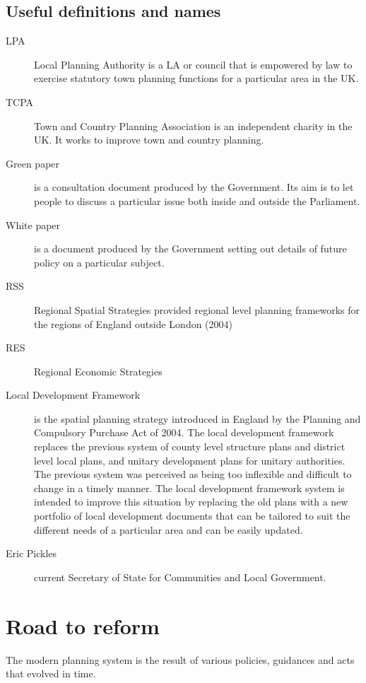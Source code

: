 \documentclass{article}
\begin{document}
	\subsection*{Useful definitions and names}
	\begin{description}
		\item[LPA] Local Planning Authority is a LA or council that is empowered by law to exercise statutory
		town planning functions for a particular area in the UK.
		\item[TCPA] Town and Country Planning Association is an independent charity in the UK. It works
		to improve town and country planning.
		\item[Green paper] is a consultation document produced by the Government. Its aim is to let people
		to discuss a particular issue both inside and outside the Parliament. 
		\item[White paper] is a document produced by the Government setting out details
		of future policy on a particular subject.
		\item[RSS] Regional Spatial Strategies
		provided regional level planning frameworks for the regions of England outside London (2004)
		\item[RES] Regional Economic Strategies
		\item[Local Development Framework] is the spatial planning strategy introduced in England by the
		Planning and Compulsory Purchase Act of 2004.
		The local development framework replaces the previous system of county level structure plans and
		district level local plans, and unitary development plans for unitary authorities.
		The previous system was perceived as being too inflexible and difficult to change in a timely manner.
		The local development framework system is intended to improve this situation by replacing the old
		plans with a new portfolio of local development documents that can be tailored to suit the different
		needs of a particular area and can be easily updated.
		\item[Eric Pickles] current Secretary of State for Communities and Local Government.
	\end{description}
	
	\section{Road to reform}	
	The modern planning system is the result of various policies, guidances and acts that evolved
	in time.
	
\end{document}

